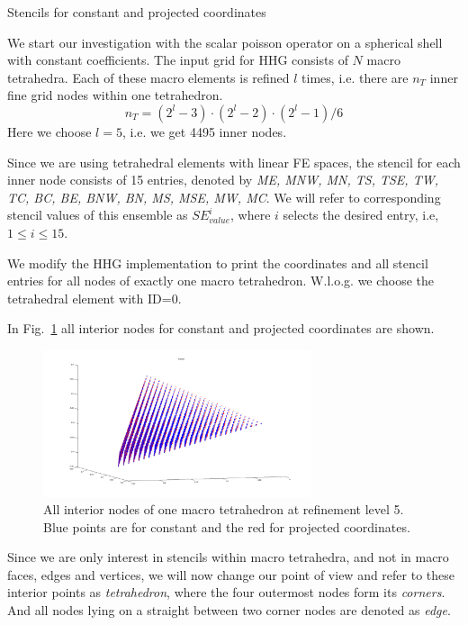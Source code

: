 \documentclass[a4paper,11pt,reqno]{amsart}
\numberwithin{figure}{section}
\numberwithin{table}{section}
\def\si{SE_{value}^i}
\begin{document}
\begin{section}{Stencils for constant and projected coordinates}

We start our investigation with the scalar poisson operator on a spherical
shell with constant coefficients. 
The input grid for HHG consists of $N$ macro tetrahedra. Each of these
macro elements is refined $l$ times, i.e. there are $n_T$ inner fine grid nodes
within one tetrahedron.
\begin{equation}
n_T = \left(2^l - 3\right)\cdot\left(2^l - 2\right)\cdot\left(2^l - 1\right)/6
\end{equation}
Here we choose $l=5$, i.e. we get 4495 inner nodes.

Since we are using tetrahedral elements with linear FE spaces, the stencil
for each inner node consists of 15 entries,  denoted by
\emph{ME, MNW, MN, TS, TSE, TW, TC, BC, BE, BNW, BN, MS, MSE, MW, MC}.
We will refer to corresponding stencil values of this ensemble as 
$\si$, where $i$ selects the desired
entry, i.e, $1 \leq i \leq 15$.

We modify the HHG implementation to print the coordinates and all stencil entries
for all nodes of exactly one macro tetrahedron. W.l.o.g. we choose the tetrahedral
element with ID=0.

In Fig.~\ref{fig:tet0Nodes} all interior nodes for constant and projected coordinates
are shown.

\begin{figure}\centering
\includegraphics[width=0.7\textwidth]{pics/tetInnerNodes} 
\caption{All interior nodes of one macro tetrahedron at refinement level 5.
Blue points are for constant and the red for projected coordinates.}
\label{fig:tet0Nodes}
\end{figure}   

Since we are only interest in stencils within macro tetrahedra, and not in macro faces,
edges and vertices, we will now change our point of view and refer to these interior points
as \emph{tetrahedron}, where the four outermost nodes form its \emph{corners}. 
And all nodes lying on a straight between two corner nodes are denoted as \emph{edge}.



\end{section}
\end{document}
